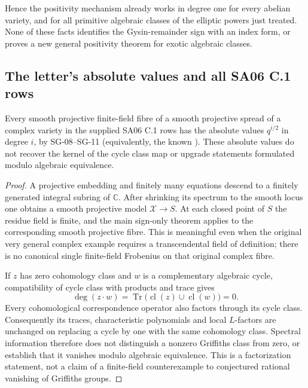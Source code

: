 Hence the positivity mechanism already works in degree one for every abelian variety, and for all primitive algebraic classes of the elliptic powers just treated. None of these facts identifies the Gysin-remainder sign with an index form, or proves a new general positivity theorem for exotic algebraic classes.

\subsection{The letter's absolute values and all SA06 C.1 rows}

\begin{proposition}
Every smooth projective finite-field fibre of a smooth projective spread of a complex variety in the supplied SA06 C.1 rows has the absolute values $q^{i/2}$ in degree $i$, by SG-08--SG-11 (equivalently, the known \cite[Th.~1.6]{WeilI}). These absolute values do not recover the kernel of the cycle class map or upgrade statements formulated modulo algebraic equivalence.
\end{proposition}

\begin{proof}
A projective embedding and finitely many equations descend to a finitely generated integral subring of $\mathbb C$. After shrinking its spectrum to the smooth locus one obtains a smooth projective model $\mathcal X\to S$. At each closed point of $S$ the residue field is finite, and the main sign-only theorem applies to the corresponding smooth projective fibre. This is meaningful even when the original very general complex example requires a transcendental field of definition; there is no canonical single finite-field Frobenius on that original complex fibre.

If $z$ has zero cohomology class and $w$ is a complementary algebraic cycle, compatibility of cycle class with products and trace gives
\[
 \deg(z\cdot w)=\operatorname{Tr}\bigl(\operatorname{cl}(z)\cup\operatorname{cl}(w)\bigr)=0.
\]
Every cohomological correspondence operator also factors through its cycle class. Consequently its traces, characteristic polynomials and local $L$-factors are unchanged on replacing a cycle by one with the same cohomology class. Spectral information therefore does not distinguish a nonzero Griffiths class from zero, or establish that it vanishes modulo algebraic equivalence. This is a factorization statement, not a claim of a finite-field counterexample to conjectured rational vanishing of Griffiths groups.
\end{proof}

